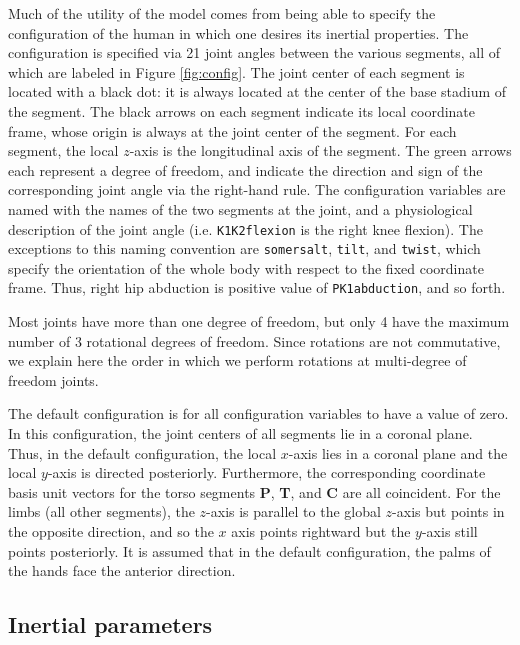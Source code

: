 \documentclass[10pt]{article}
\begin{document}
Much of the utility of the model comes from being able to specify the
configuration of the human in which one desires its inertial properties. The configuration is specified via 21 joint angles between the various segments, all of which are
labeled in Figure \ref{fig:config}. The joint center of each segment is located
with a black dot: it is always located at the center of the base stadium of the
segment. The black arrows on each
segment indicate its local coordinate frame, whose origin is always at the
joint center of the segment. For each segment, the local $z$-axis is the longitudinal axis of the segment. The green arrows
each represent a degree of freedom, and indicate the direction and sign of the
corresponding joint angle via the right-hand rule. The configuration variables
are named with the names of the two segments at the joint, and a physiological
description of the joint angle (i.e. \verb+K1K2flexion+ is the right knee
flexion). The exceptions to this naming convention are \verb+somersalt+,
\verb+tilt+, and \verb+twist+, which specify the orientation of the whole body
with respect to the fixed coordinate frame. Thus, right hip abduction is
positive value of \verb+PK1abduction+, and so forth.

Most joints have more than one degree of freedom, but only 4 have the maximum
number of 3 rotational degrees of freedom. Since rotations are not commutative,
we explain here the order in which we perform rotations at multi-degree of
freedom joints.



The default configuration is for all configuration variables to have a value of
zero. In this configuration, the joint centers of all
segments lie in a coronal
plane. Thus, in the default configuration, the local $x$-axis lies in a coronal
plane and the local $y$-axis is directed posteriorly. Furthermore, the
corresponding coordinate basis unit vectors for the torso segments \textbf{P},
\textbf{T}, and \textbf{C} are all coincident. For the limbs (all other
segments), the $z$-axis is parallel to the global $z$-axis but points in the
opposite direction, and so the $x$ axis points rightward but the $y$-axis still
points posteriorly. It is assumed that in the default configuration,
the palms of the hands face the anterior direction.

\subsection*{Inertial parameters}
\end{document}

